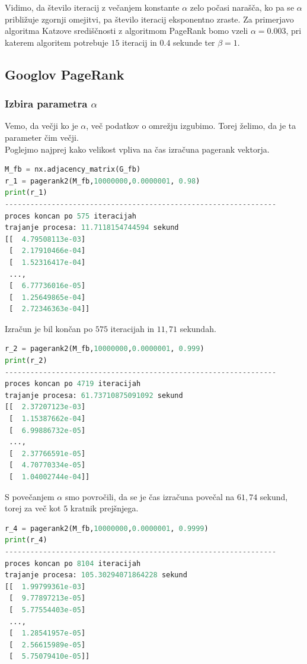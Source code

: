 \documentclass[a4paper]{article}
\begin{document}
Vidimo, da število iteracij z večanjem konstante $\alpha$ zelo počasi narašča, ko pa se $\alpha$ približuje zgornji omejitvi, pa število iteracij eksponentno zraste.
Za primerjavo algoritma Katzove središčnosti z algoritmom PageRank bomo vzeli $\alpha = 0.003$, pri katerem algoritem potrebuje $15$ iteracij in $0.4$ sekunde ter $\beta = 1.$

\subsection{Googlov PageRank}
\subsubsection{Izbira parametra $\alpha$} 
\hspace{4.8mm}Vemo, da večji ko je $\alpha$, več podatkov o omrežju izgubimo. Torej želimo, da je ta parameter čim večji. \\
Poglejmo najprej kako velikost vpliva na čas izračuna pagerank vektorja. 

\begin{lstlisting}[language=Python]
M_fb = nx.adjacency_matrix(G_fb)
r_1 = pagerank2(M_fb,10000000,0.0000001, 0.98)
print(r_1)
----------------------------------------------------------------
proces koncan po 575 iteracijah
trajanje procesa: 11.7118154744594 sekund
[[  4.79508113e-03]
 [  2.17910466e-04]
 [  1.52316417e-04]
 ..., 
 [  6.77736016e-05]
 [  1.25649865e-04]
 [  2.72346363e-04]]
\end{lstlisting}

Izračun je bil končan po $575$ iteracijah in $11,71$ sekundah.

\begin{lstlisting}[language=Python]
r_2 = pagerank2(M_fb,10000000,0.0000001, 0.999)
print(r_2)
----------------------------------------------------------------
proces koncan po 4719 iteracijah
trajanje procesa: 61.73710875091092 sekund
[[  2.37207123e-03]
 [  1.15387662e-04]
 [  6.99886732e-05]
 ..., 
 [  2.37766591e-05]
 [  4.70770334e-05]
 [  1.04002744e-04]]
\end{lstlisting}
S povečanjem $\alpha$ smo povročili, da se je čas izračuna povečal na $61,74$ sekund, torej za več kot $5$ kratnik prejšnjega. 

\begin{lstlisting}[language=Python]
r_4 = pagerank2(M_fb,10000000,0.0000001, 0.9999)
print(r_4)
----------------------------------------------------------------
proces koncan po 8104 iteracijah
trajanje procesa: 105.30294071864228 sekund
[[  1.99799361e-03]
 [  9.77897213e-05]
 [  5.77554403e-05]
 ..., 
 [  1.28541957e-05]
 [  2.56615989e-05]
 [  5.75079410e-05]]
\end{lstlisting}
\end{document}

